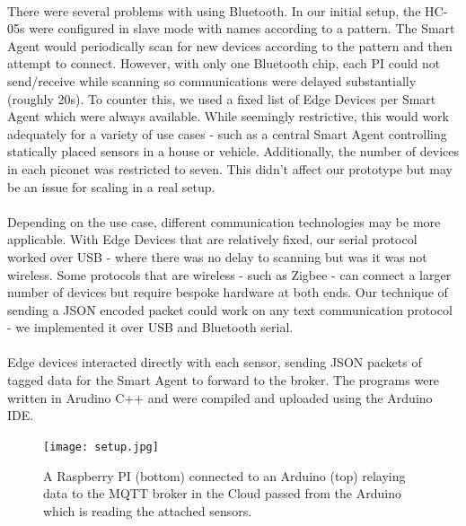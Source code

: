 \paragraph{}
There were several problems with using Bluetooth. In our initial setup, the HC-05s were configured in slave mode with names according to a pattern. The Smart Agent would periodically scan for new devices according to the pattern and then attempt to connect. However, with only one Bluetooth chip, each PI could not send/receive while scanning so communications were delayed substantially (roughly 20s). To counter this, we used a fixed list of Edge Devices per Smart Agent which were always available. While seemingly restrictive, this would work adequately for a variety of use cases - such as a central Smart Agent controlling statically placed sensors in a house or vehicle. Additionally, the number of devices in each piconet was restricted to seven. This didn't affect our prototype but may be an issue for scaling in a real setup.

\paragraph{}
Depending on the use case, different communication technologies may be more applicable. With Edge Devices that are relatively fixed, our serial protocol worked over USB - where there was no delay to scanning but was it was not wireless. Some protocols that are wireless - such as Zigbee - can connect a larger number of devices but require bespoke hardware at both ends. Our technique of sending a JSON encoded packet could work on any text communication protocol - we implemented it over USB and Bluetooth serial.

\paragraph{}
Edge devices interacted directly with each sensor, sending JSON packets of tagged data for the Smart Agent to forward to the broker. The programs were written in Arudino C++ and were compiled and uploaded using the Arduino IDE.


\begin{figure}
    \centering
    \texttt{[image: setup.jpg]}
    \caption{A Raspberry PI (bottom) connected to an Arduino (top) relaying data to the MQTT broker in the Cloud passed from the Arduino which is reading the attached sensors.}
    \label{fig:setup}
\end{figure}

